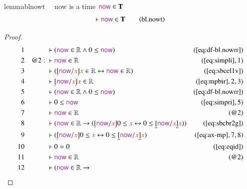 \begin{restatable}{lemma}{blnowt}~~ now is a time $\mathsf{\mc{now}} \in
\mathbf{T}$
\begin{align}
\vdash \mathsf{\mc{now}} \in \mathbf{T}\label{eq:bl.nowt}\tag{bl.nowt}
\end{align}
\end{restatable}

\begin{proof}
\begin{align}
  1 &&  & \vdash ( \mathsf{\mc{now}} \in \mathbb{R} \wedge 0 \le
      \mathsf{\mc{now}}
      )&(\mbox{\ref{eq:df-bl.nowrr}})\notag
  \\ 2 && @2:\  & \vdash \mathsf{\mc{now}} \in
      \mathbb{R}&(\mbox{\ref{eq:simpli}},1)\notag
  \\ 3 &&  & \vdash ( \underaccent{\dot}{[} \mathsf{\mc{now}} / \msc{x}
      \underaccent{\dot}{]} \msc{x} \in \mathbb{R}
      \leftrightarrow \mathsf{\mc{now}} \in \mathbb{R}
      )&(\mbox{\ref{eq:sbcel1v}})\notag
  \\ 4 &&  & \vdash \underaccent{\dot}{[} \mathsf{\mc{now}} / \msc{x}
      \underaccent{\dot}{]} \msc{x} \in
      \mathbb{R}&(\mbox{\ref{eq:mpbir}},2,3)\notag
  \\ 5 &&  & \vdash ( \mathsf{\mc{now}} \in \mathbb{R} \wedge 0 \le
      \mathsf{\mc{now}}
      )&(\mbox{\ref{eq:df-bl.nowrr}})\notag
  \\ 6 &&  & \vdash 0 \le \mathsf{\mc{now}}&(\mbox{\ref{eq:simpri}},5)\notag
  \\ 7 &&  & \vdash \mathsf{\mc{now}} \in \mathbb{R}&(@2)\notag
  \\ 8 &&  & \vdash ( \mathsf{\mc{now}} \in \mathbb{R} \rightarrow (
      \underaccent{\dot}{[} \mathsf{\mc{now}} / \msc{x}
      \underaccent{\dot}{]} 0 \le \msc{x} \leftrightarrow 0
      \le \underline{[} \mathsf{\mc{now}} / \msc{x}
      \underline{]} \msc{x} )
      )&(\mbox{\ref{eq:sbcbr2g}})\notag
  \\ 9 &&  & \vdash ( \underaccent{\dot}{[} \mathsf{\mc{now}} / \msc{x}
      \underaccent{\dot}{]} 0 \le \msc{x} \leftrightarrow 0
      \le \underline{[} \mathsf{\mc{now}} / \msc{x}
      \underline{]} \msc{x}
      )&(\mbox{\ref{eq:ax-mp}},7,8)\notag
  \\ 10 &&  & \vdash 0 = 0&(\mbox{\ref{eq:eqid}})\notag
  \\ 11 &&  & \vdash \mathsf{\mc{now}} \in \mathbb{R}&(@2)\notag
  \\ 12 &&  & \vdash ( \mathsf{\mc{now}} \in \mathbb{R} \rightarrow

\end{align}
\end{proof}
